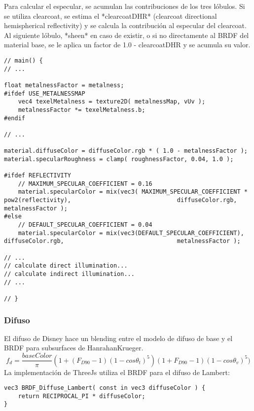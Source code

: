         Para calcular el especular, se acumulan las contribuciones de los tres
        lóbulos. Si se utiliza clearcoat, se estima el *clearcoatDHR*
        (clearcoat directional hemispherical reflectivity) y se calcula la
        contribución al especular del clearcoat. Al siguiente lóbulo, *sheen* en
        caso de existir, o si no directamente al BRDF del material base, se le
        aplica un factor de 1.0 - clearcoatDHR y se acumula su valor.
        \singlespacing
        \begin{lstlisting}[caption=My Javascript Example]
// main() {
// ...

float metalnessFactor = metalness;
#ifdef USE_METALNESSMAP
    vec4 texelMetalness = texture2D( metalnessMap, vUv );
    metalnessFactor *= texelMetalness.b;
#endif

// ...

material.diffuseColor = diffuseColor.rgb * ( 1.0 - metalnessFactor );
material.specularRoughness = clamp( roughnessFactor, 0.04, 1.0 );

#ifdef REFLECTIVITY
    // MAXIMUM_SPECULAR_COEFFICIENT = 0.16
    material.specularColor = mix(vec3( MAXIMUM_SPECULAR_COEFFICIENT * pow2(reflectivity),                              diffuseColor.rgb, metalnessFactor );
#else
    // DEFAULT_SPECULAR_COEFFICIENT = 0.04
    material.specularColor = mix(vec3(DEFAULT_SPECULAR_COEFFICIENT), diffuseColor.rgb,                                metalnessFactor );

// ...
// calculate direct illumination...
// calculate indirect illumination...
// ...
                                    
// }
        \end{lstlisting}

        \subsubsection{Difuso}
            El difuso de Disney hace un blending entre el modelo de difuso de base y el BRDF para
            subsurfaces de HanrahanKrueger.
            $$
            f_d = \frac{baseColor}{\pi}(1 + (F_{D90} - 1) (1 - cos{\theta}_t)^5)(1 + F_{D90} - 1)
            (1 - cos\theta_v)^5)
            $$
            La implementación de ThreeJs utiliza el BRDF para el difuso de Lambert:
            \singlespacing
            \begin{lstlisting}[caption=My Javascript Example]
vec3 BRDF_Diffuse_Lambert( const in vec3 diffuseColor ) {
    return RECIPROCAL_PI * diffuseColor;
}
            \end{lstlisting}

